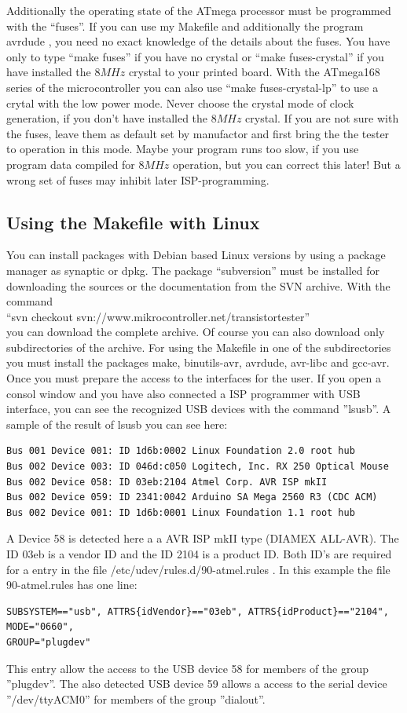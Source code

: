 Additionally the operating state of the
ATmega processor must be programmed with the ``fuses''.
If you can use my Makefile and additionally the program avrdude \cite{avrdude}, you need no exact
knowledge of the details about the fuses. You have only to type ``make fuses'' if you
have no crystal or ``make fuses-crystal'' if you have installed the \(8MHz\) crystal to your printed board.
With the ATmega168 series of the microcontroller you can also use ``make fuses-crystal-lp'' to use
a crytal with the low power mode.
Never choose the crystal mode of clock generation, if you don't have installed
the \(8MHz\) crystal. If you are not sure with the fuses, leave them as default
set by manufactor and first bring the the tester to operation in this mode.
Maybe your program runs too slow, if you use program data compiled for
\(8MHz\) operation, but you can correct this later! But a wrong set of fuses may inhibit
later ISP-programming.

\subsection{Using the Makefile with Linux}
You can install packages with Debian based Linux versions by using a package manager as synaptic or dpkg.
The package ``subversion'' must be installed for downloading the sources or the documentation from the SVN archive.
With the command \\
``svn checkout svn://www.mikrocontroller.net/transistortester'' \\
you can download the complete archive.
Of course you can also download only subdirectories of the archive.
For using the Makefile in one of the subdirectories you must install the packages
make, binutils-avr, avrdude, avr-libc and gcc-avr.
Once you must prepare the access to the interfaces for the user.
If you open a consol window and you have also connected a ISP programmer with USB interface,
you can see the recognized USB devices with the command ''lsusb''.
A sample of the result of lsusb you can see here:
\begin{verbatim}
Bus 001 Device 001: ID 1d6b:0002 Linux Foundation 2.0 root hub
Bus 002 Device 003: ID 046d:c050 Logitech, Inc. RX 250 Optical Mouse
Bus 002 Device 058: ID 03eb:2104 Atmel Corp. AVR ISP mkII
Bus 002 Device 059: ID 2341:0042 Arduino SA Mega 2560 R3 (CDC ACM)
Bus 002 Device 001: ID 1d6b:0001 Linux Foundation 1.1 root hub
\end{verbatim}
A Device 58 is detected here a a AVR ISP mkII type (DIAMEX ALL-AVR).
The ID 03eb is a vendor ID and the ID 2104 is a product ID.
Both ID's are required for a entry in the file /etc/udev/rules.d/90-atmel.rules .
In this example the file 90-atmel.rules has one line:
\begin{verbatim}
SUBSYSTEM=="usb", ATTRS{idVendor}=="03eb", ATTRS{idProduct}=="2104", MODE="0660",
GROUP="plugdev"
\end{verbatim}
This entry allow the access to the USB device 58 for members of the group ''plugdev''.
The also detected USB device 59 allows a access to the serial device ''/dev/ttyACM0'' for
members of the group ''dialout''.

